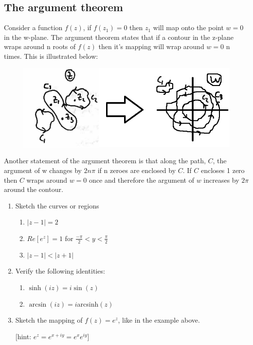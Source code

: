 \subsection{The argument theorem}
Consider a function $f(z)$, if $f(z_1)=0$ then $z_1$ will map onto the point $w=0$ in the w-plane.
 The argument theorem states that if a contour in the z-plane wraps around n roots of $f(z)$ then it's mapping will wrap around $w=0$ n times. 
 This is illustrated below:
\begin{figure}[H]
	\centering
	\includegraphics[width=\linewidth]{complex/argthm}
	\captionsetup{font=small} 	
\end{figure}
\noindent Another statement of the argument theorem is that along the path, $C$, the argument of w changes by $2n\pi$ if n zeroes are enclosed by $C$.
 If $C$ encloses 1 zero then $C$ wraps around $w=0$ once and therefore the argument of $w$ increases by $2\pi$ around the contour.
%
\begin{examples}
	\begin{enumerate}
		\item Sketch the curves or regions
		\begin{enumerate}
			\item $|z-1|=2$
			\item $Re[e^z]=1$ for $\frac{-\pi}{2} < y < \frac{\pi}{2}$
			\item $|z-1|<|z+1|$
		\end{enumerate}
		\item Verify the following identities:
		\begin{enumerate}
			\item $\sinh(iz)=i\sin(z)$
			\item $\arcsin(iz)=i$arcsinh$(z)$
		\end{enumerate}
		\item Sketch the mapping of $f(z)=e^z$, like in the example above.
		
		 [hint: $e^z=e^{x+iy}=e^xe^{iy}$]
	\end{enumerate}
\end{examples}
%
%
%
